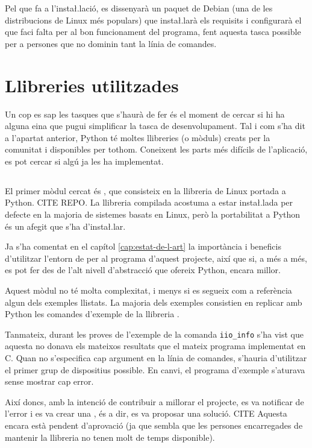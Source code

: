 Pel que fa a l'insta\l.lació, es dissenyarà un paquet de Debian (una de les
distribucions de Linux més populars) que insta\l.larà els requisits i configurarà
el que faci falta per al bon funcionament del programa, fent aquesta tasca
possible per a persones que no dominin tant la línia de comandes.

\section{Llibreries utilitzades}

Un cop es sap les tasques que s'haurà de fer és el moment de cercar si hi ha
alguna eina que pugui simplificar la tasca de desenvolupament. Tal i com s'ha dit
a l'apartat anterior, Python té moltes llibreries (o mòduls) creats per la
comunitat i disponibles per tothom. Coneixent les parts més difícils de
l'aplicació, es pot cercar si algú ja les ha implementat.

\subsection{}

El primer mòdul cercat és , que consisteix en la llibreria de
Linux  portada a Python. CITE REPO. La llibreria compilada acostuma
a estar insta\l.lada per defecte en la majoria de sistemes basats en Linux, però
la portabilitat a Python és un afegit que s'ha d'insta\l.lar.

Ja s'ha comentat en el capítol \ref{cap:estat-de-l-art} la importància
i beneficis d'utilitzar l'entorn de  per al programa d'aquest projecte,
així que si, a més a més, es pot fer des de l'alt nivell d'abstracció que ofereix
Python, encara millor.

Aquest mòdul no té molta complexitat, i menys si es segueix com a referència
algun dels exemples llistats. La majoria dels exemples consistien en replicar
amb Python les comandes d'exemple de la llibreria .

Tanmateix, durant les proves de l'exemple de la comanda \verb|iio_info| s'ha
vist que aquesta no donava els mateixos resultats que el mateix programa implementat
en C. Quan no s'especifica cap argument en la línia de comandes, s'hauria 
d'utilitzar el primer grup de dispositius possible. En canvi, el programa d'exemple
s'aturava sense mostrar cap error.

Així doncs, amb la intenció de contribuir a millorar el projecte, es va
notificar de l'error i es va crear una , és a dir, es va
proposar una solució. CITE Aquesta encara està pendent d'aprovació (ja que sembla que
les persones encarregades de mantenir la llibreria no tenen molt de temps
disponible).

